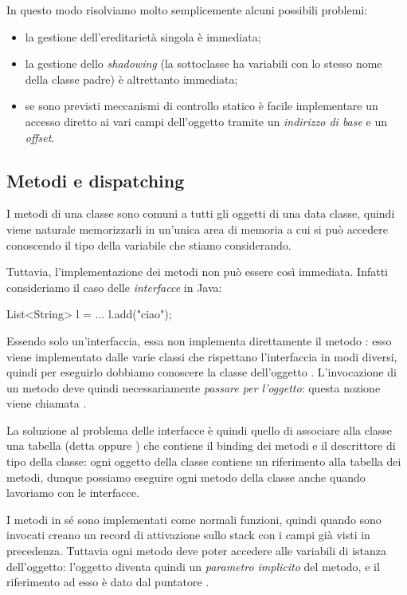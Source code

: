 In questo modo risolviamo molto semplicemente alcuni possibili problemi:
\begin{itemize}
    \item la gestione dell'ereditarietà singola è immediata;
    \item la gestione dello \emph{shadowing} (la sottoclasse ha variabili con lo stesso nome della classe padre) è altrettanto immediata;
    \item se sono previsti meccanismi di controllo statico è facile implementare un accesso diretto ai vari campi dell'oggetto tramite un \emph{indirizzo di base} e un \emph{offset}.
\end{itemize}

\subsection*{Metodi e dispatching}

I metodi di una classe sono comuni a tutti gli oggetti di una data classe, quindi viene naturale memorizzarli in un'unica area di memoria a cui si può accedere conoscendo il tipo della variabile che stiamo considerando.

Tuttavia, l'implementazione dei metodi non può essere così immediata. Infatti consideriamo il caso delle \emph{interfacce} in Java:
\begin{Java}
    List<String> l = ...
    l.add("ciao");
\end{Java}
Essendo  solo un'interfaccia, essa non implementa direttamente il metodo : esso viene implementato dalle varie classi che rispettano l'interfaccia  in modi diversi, quindi per eseguirlo dobbiamo conoscere la classe dell'oggetto . 
L'invocazione di un metodo deve quindi necessariamente \emph{passare per l'oggetto}: questa nozione viene chiamata .

La soluzione al problema delle interfacce è quindi quello di associare alla classe una tabella (detta  oppure ) che contiene il binding dei metodi e il descrittore di tipo della classe: ogni oggetto della classe contiene un riferimento alla tabella dei metodi, dunque possiamo eseguire ogni metodo della classe anche quando lavoriamo con le interfacce. 

I metodi in sé sono implementati come normali funzioni, quindi quando sono invocati creano un record di attivazione sullo stack con i campi già visti in precedenza. Tuttavia ogni metodo deve poter accedere alle variabili di istanza dell'oggetto: l'oggetto diventa quindi un \emph{parametro implicito} del metodo, e il riferimento ad esso è dato dal puntatore .

